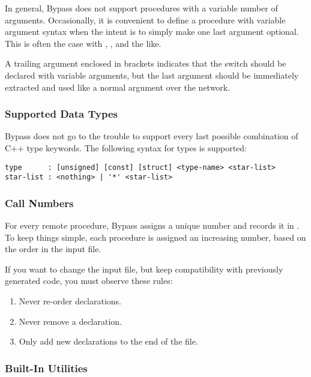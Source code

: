 In general, Bypass does not support procedures with a variable number of arguments.  Occasionally, it is convenient to define a procedure with variable argument syntax when the intent is to simply make one last argument optional.  This is often the case with , , and the like.

A trailing argument enclosed in brackets indicates that the switch should be declared with variable arguments, but the last argument should be immediately extracted and used like a normal argument over the network.

\subsubsection{Supported Data Types}

Bypass does not go to the trouble to support every last possible combination of C++ type keywords.  The following syntax for types is supported:

\begin{verbatim}
type      : [unsigned] [const] [struct] <type-name> <star-list>
star-list : <nothing> | '*' <star-list>
\end{verbatim}

\subsubsection{Call Numbers}

For every remote procedure, Bypass assigns a unique number and records it in .  To keep things simple, each procedure is assigned an increasing number, based on the order in the input file.


If you want to change the input file, but keep compatibility with previously generated code, you must observe these rules:

\begin{enumerate}
\item Never re-order declarations.
\item Never remove a declaration.
\item Only add new declarations to the end of the file.
\end{enumerate}

\subsubsection{Built-In Utilities}

